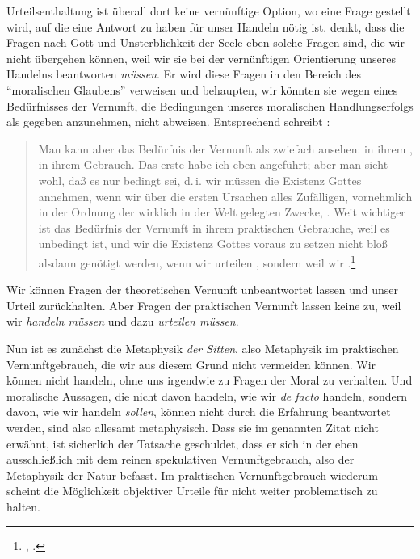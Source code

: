 \begin{nummerierung}
Urteilsenthaltung ist überall dort keine vernünftige
Option, wo eine Frage gestellt wird, auf die eine Antwort zu haben für unser
Handeln nötig ist.  denkt, dass die Fragen nach Gott und
Unsterblichkeit der Seele eben solche Fragen sind, die wir nicht übergehen
können, weil wir sie bei der vernünftigen Orientierung unseres Handelns
beantworten \emph{müssen}. Er wird diese Fragen in den Bereich des
\enquote{moralischen Glaubens} verweisen und behaupten, wir könnten sie wegen
eines Bedürfnisses der Vernunft, die Bedingungen unseres moralischen
Handlungserfolgs als gegeben anzunehmen, nicht abweisen. Entsprechend schreibt
:
\begin{quote}
Man kann aber das Bedürfnis der Vernunft als zwiefach ansehen:  in
ihrem ,  in ihrem  Gebrauch.
Das erste habe ich eben angeführt; aber man sieht wohl, daß es nur bedingt sei,
d.\,i. wir müssen die Existenz Gottes annehmen, wenn wir über die ersten
Ursachen alles Zufälligen, vornehmlich in der Ordnung der wirklich in der Welt
gelegten Zwecke, .  Weit wichtiger ist das Bedürfnis der
Vernunft in ihrem praktischen Gebrauche, weil es unbedingt ist, und wir die
Existenz Gottes voraus zu setzen nicht bloß alsdann genötigt werden, wenn wir
urteilen , sondern weil wir .\footnote{\cite[][A 315]{Kant:Washeisst:SichimDenkenorientieren?1977},
\cite[][VIII: 139.6--15]{Kant:GesammelteWerke1900ff.}.}
\end{quote}
Wir können Fragen der theoretischen Vernunft unbeantwortet lassen und unser
Urteil zurückhalten. Aber Fragen der praktischen Vernunft lassen keine
{\epoche} zu, weil wir \emph{handeln müssen} und dazu \emph{urteilen
müssen}.

Nun ist es zunächst die Metaphysik \emph{der Sitten}, also Metaphysik im
praktischen Vernunftgebrauch, die wir aus diesem Grund nicht vermeiden können.
Wir können nicht handeln, ohne uns irgendwie zu Fragen der Moral zu verhalten.
Und moralische Aussagen, die nicht davon handeln, wie wir \emph{de facto}
handeln, sondern davon, wie wir handeln \emph{sollen}, können nicht durch die
Erfahrung beantwortet werden, sind also allesamt metaphysisch. Dass
 sie im genannten Zitat nicht erwähnt, ist sicherlich der
Tatsache geschuldet, dass er sich in der  eben
ausschließlich mit dem reinen spekulativen Vernunftgebrauch, also der Metaphysik
der Natur befasst. Im praktischen Vernunftgebrauch wiederum scheint
 die Möglichkeit objektiver Urteile für nicht weiter
problematisch zu halten.


\end{nummerierung}

